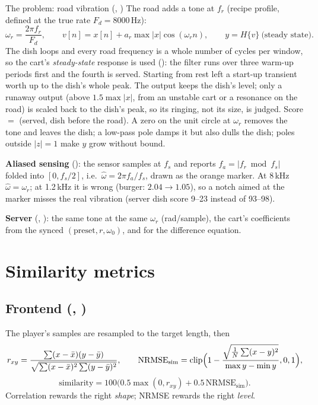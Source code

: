\documentclass[11pt,a4paper]{article}
\begin{document}
\begin{mathbox}{The problem: road vibration (, )}
The road adds a tone at $f_r$ (recipe profile, defined at the true rate $F_d=8000$\,Hz):
\[
\omega_r=\frac{2\pi f_r}{F_d},\qquad
v[n]=x[n]+a_r\max|x|\cos(\omega_r n),\qquad
y=H\{v\}\ \text{(steady state)}.
\]
The dish loops and every road frequency is a whole number of cycles per window, so the cart's
\emph{steady-state} response is used (): the filter runs over three warm-up periods
first and the fourth is served. Starting from rest left a start-up transient worth up to the
dish's whole peak. The output keeps the dish's level; only a runaway output (above
$1.5\max|x|$, from an unstable cart or a resonance on the road) is scaled back to the dish's
peak, so its ringing, not its size, is judged. Score $=$ (served,
dish before the road). A zero on the unit circle at $\omega_r$ removes the tone and leaves the
dish; a low-pass pole damps it but also dulls the dish; poles outside $|z|=1$ make $y$ grow
without bound.

\textbf{Aliased sensing} (): the sensor samples at $f_s$ and reports
$f_a=|f_r \bmod f_s|$ folded into $[0,f_s/2]$, i.e.\ $\hat\omega=2\pi f_a/f_s$, drawn as the
orange marker. At 8\,kHz $\hat\omega=\omega_r$; at 1.2\,kHz it is wrong (burger: $2.04\to1.05$),
so a notch aimed at the marker misses the real vibration (server dish score 9--23 instead
of 93--98).
\end{mathbox}

\textbf{Server} (, ): the same tone at the same
$\omega_r$ (rad/sample), the cart's coefficients from the synced $(\text{preset}, r, \omega_0)$,
and  for the difference equation.

\section{Similarity metrics}\label{sec:similarity}
\subsection{Frontend (, )}
The player's samples are resampled to the target length, then
\[
r_{xy}=\frac{\sum(x-\bar x)(y-\bar y)}{\sqrt{\sum(x-\bar x)^2\sum(y-\bar y)^2}},\qquad
\text{NRMSE}_{\text{sim}}=\operatorname{clip}\Bigl(1-\frac{\sqrt{\tfrac1N\sum(x-y)^2}}{\max y-\min y},0,1\Bigr),
\]
\[
\text{similarity}=100\bigl(0.5\max(0,r_{xy})+0.5\,\text{NRMSE}_{\text{sim}}\bigr).
\]
Correlation rewards the right \emph{shape}; NRMSE rewards the right \emph{level}.
\end{document}
